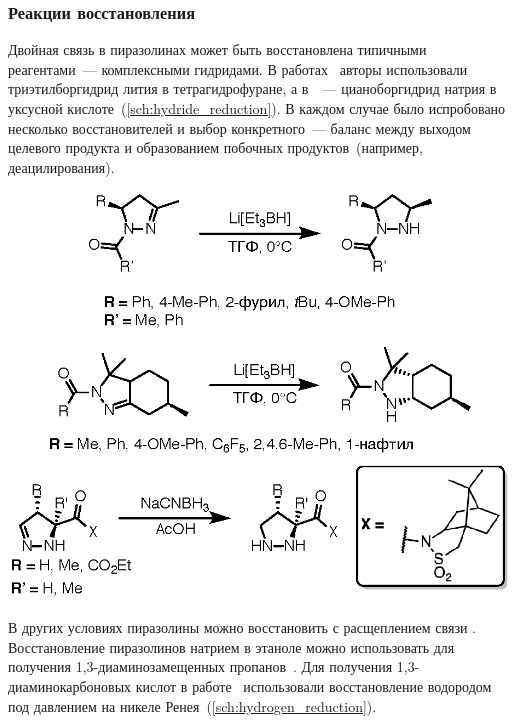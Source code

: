 

\subsubsection{Реакции восстановления}
Двойная связь  в пиразолинах может быть восстановлена типичными реагентами~--- комплексными гидридами. В работах~\cite{Jakob2010, DeLosSantos2008a} авторы использовали триэтилборгидрид лития в тетрагидрофуране, а в~\cite{Mish1997a}~--- цианоборгидрид натрия в уксусной кислоте~(\ref{sch:hydride_reduction}).
В каждом случае было испробовано несколько восстановителей и выбор конкретного~--- баланс между выходом целевого продукта и образованием побочных продуктов~(например, деацилирования).

\begin{scheme}
    \centering
    \includegraphics{sections/literature/img/hydride_reduction.eps}
    \caption{}
    \label{sch:hydride_reduction}
\end{scheme}

В других условиях пиразолины можно восстановить с расщеплением связи .
Восстановление пиразолинов натрием в этаноле можно использовать для получения 1,3-диаминозамещенных пропанов~\cite{Chemistry1967}.
Для получения 1,3-диаминокарбоновых кислот в работе~\cite{Carter1949} использовали восстановление водородом под давлением на никеле Ренея~(\ref{sch:hydrogen_reduction}).

